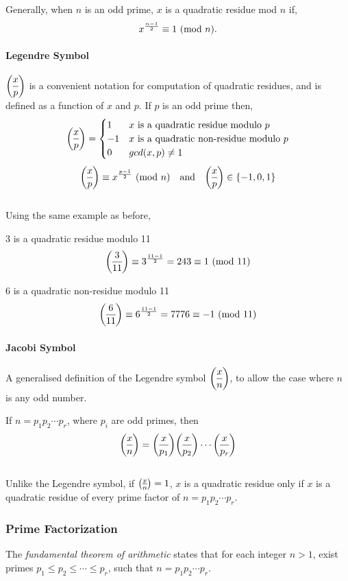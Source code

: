 \bigskip
\noindent
Generally, when $n$ is an odd prime, $x$ is a quadratic residue mod $n$ if,
$$x^{\frac{n-1}{2}} \equiv 1 \ (\mathrm{mod}\ n).$$

\paragraph{Legendre Symbol} $\dlegendre{x}{p}$ is a convenient notation for computation of quadratic residues, and is defined as a function of $x$ and $p$.
\bigskip
\newline
If $p$ is an odd prime then,
$$
\dlegendre{x}{p} =
		\begin{cases}
			1 & \text{$x$ is a quadratic residue modulo $p$}\\
			-1 & \text{$x$ is a quadratic non-residue modulo $p$}\\
			0 & \text{$gcd(x, p) \not = 1$}\\
		\end{cases}
$$
\smallskip
$$
\dlegendre{x}{p} \equiv x^{\frac{p - 1}{2}} \Mod{n} \quad \text{and} \quad \dlegendre{x}{p} \in \{-1, 0, 1\}
$$\\
Using the same example as before,

\begin{description}
	\item 3 is a quadratic residue modulo 11
	\medskip
	$$\dlegendre{3}{11}\equiv 3^{\frac{11-1}{2}} = 243 \equiv 1 \Mod{11}$$
	\item 6 is a quadratic non-residue modulo 11
	\medskip
	$$\dlegendre{6}{11}\equiv 6^{\frac{11-1}{2}} = 7776  \equiv -1 \Mod{11}$$

\end{description}

\paragraph{Jacobi Symbol}
A generalised definition of the Legendre symbol $\dlegendre{x}{n}$, to allow the case where $n$ is any odd number.

If $n = p_1p_2 \cdots p_r$, where $p_i$ are odd primes, then
$$\dlegendre{x}{n} = \dlegendre{x}{p_1}\dlegendre{x}{p_2} \cdots\dlegendre{x}{p_r}$$
\\
Unlike the Legendre symbol, if $\legendre{x}{n} = 1$, $x$ is a quadratic residue only if $x$ is a quadratic residue of every prime factor of $n=p_1p_2 \cdots p_r$.

\subsubsection{Prime Factorization}
The \textit{fundamental theorem of arithmetic} \cite{andrews1994number} states that for each integer \newline $n > 1$, exist primes $p_1 \le p_2 \le \cdots \le p_r$, such that $n = p_1 p_2 \cdots p_r$.

